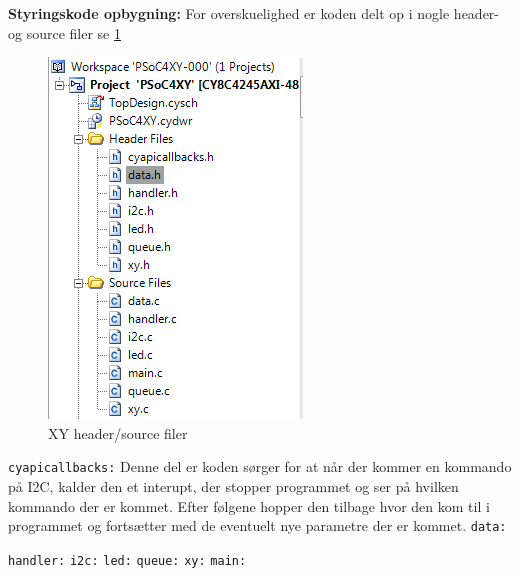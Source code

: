\textbf{Styringskode opbygning:}\newline
For overskuelighed er koden delt op i nogle header- og source filer se \ref{fig:XYhs} 

\begin{figure}[H] \centering
    \includegraphics[width=0.3\linewidth]{0_Filer/Figuer/5_HW_Design/HeaderSourceOversigt.PNG}
    \caption{XY header/source filer}
    \label{fig:XYhs}
\end{figure}

\verb+cyapicallbacks:+\newline
Denne del er koden sørger for at når der kommer en kommando på I2C, kalder den et interupt, der stopper programmet og ser på hvilken kommando der er kommet. Efter følgene hopper den tilbage hvor den kom til i programmet og fortsætter med de eventuelt nye parametre der er kommet. \newline
\verb+data:+\newline

\verb+handler:+\newline
\verb+i2c:+\newline
\verb+led:+\newline
\verb+queue:+\newline
\verb+xy:+\newline
\verb+main:+\newline


